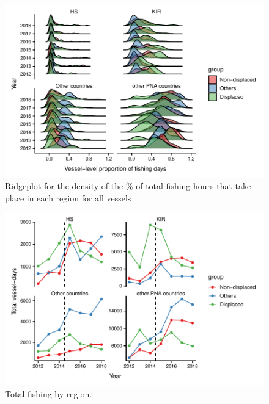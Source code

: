 \documentclass[9p,twocolumn,twoside,lineno]{pnas-new}
\begin{document}
\begin{figure}
\centering
	\includegraphics{img/yearly_distribution_prop_fishing_by_region.pdf}
	\caption{\label{fig:yearly_distribution_prop_fishing_by_region}Ridgeplot for the density of the \% of total fishing hours that take place in each region for all vessels}	

\end{figure}

\begin{figure}
\centering
	\includegraphics{img/yearly_total_fishing_by_region.pdf}
	\caption{\label{fig:yearly_total_fishing_by_region}Total fishing by region.}	
\end{figure}
\end{document}
